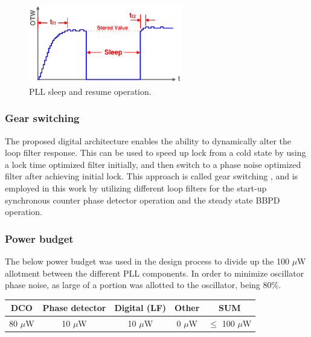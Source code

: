 			\begin{figure}[htb!]
			        \centering
			        \includegraphics[width=0.6\textwidth, angle=0]{./figs/design/pll_sleep}
			    \caption{PLL sleep and resume operation.}
			    \label{fig:pll_sleep}
			\end{figure}


	\subsubsection{Gear switching}
	The proposed digital architecture enables the ability to dynamically alter the loop filter response. This can be used to speed up lock from a cold state by using a lock time optimized filter initially, and then switch to a phase noise optimized filter after achieving initial lock. This approach is called gear switching \cite{staszewski_balsara_2007}, and is employed in this work by utilizing different loop filters for the start-up synchronous counter phase detector operation and the steady state BBPD operation.
	
	\subsubsection{Power budget}
	The below power budget was used in the design process to divide up the 100 $\mu$W allotment between the different PLL components. In order to minimize oscillator phase noise, as large of a portion was allotted to the oscillator, being 80\%. 
		\begin{table}[htb!]
			\centering
			\def\arraystretch{1.5}		
			\setlength\arrayrulewidth{0.75pt}
			\setlength{\tabcolsep}{1em} %
			\begin{tabular}{|c|c|c|c|c|}
				\hline 
				\rule[-1ex]{0pt}{2.5ex} \cellcolor{gray!40}\textbf{DCO} & \cellcolor{gray!40}\textbf{Phase detector} & \cellcolor{gray!40}\textbf{Digital (LF)}& \cellcolor{gray!40}\textbf{Other} & \cellcolor{gray!40}\textbf{SUM} \\ 
				\hline 
				\rule[-1ex]{0pt}{2.5ex} 80 $\mu$W& 10 $\mu$W &  10 $\mu$W  & 0 $ \mu$W & $\leq$ 100  $\mu$W\\ 
				\hline 
			\end{tabular} 
		\end{table}   



